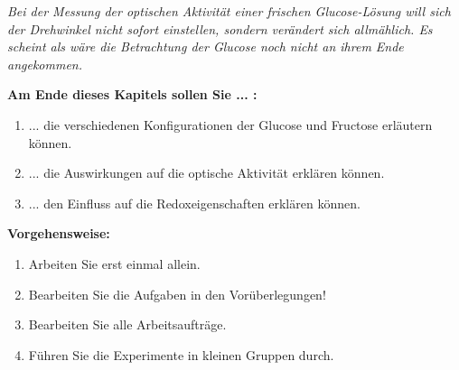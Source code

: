 \documentclass{scrartcl}  %
\begin{document}
		\textit{Bei der Messung der optischen Aktivität einer frischen Glucose-Lösung will sich der Drehwinkel nicht sofort einstellen, sondern verändert sich allmählich. Es scheint als wäre die Betrachtung der Glucose noch nicht an ihrem Ende angekommen.} \newline

		\begin{minipage}{0.7\textwidth}
			\noindent \textbf{Am Ende dieses Kapitels sollen Sie ... :}
			\begin{enumerate}
				\item ... die verschiedenen Konfigurationen der Glucose und Fructose erläutern können.
				\item ... die Auswirkungen auf die optische Aktivität erklären können.
				\item ... den Einfluss auf die Redoxeigenschaften erklären können.
			\end{enumerate}
			\textbf{Vorgehensweise:}
			\begin{enumerate}
				\item Arbeiten Sie erst einmal allein.
				\item Bearbeiten Sie die Aufgaben in den Vorüberlegungen!
				\item Bearbeiten Sie alle Arbeitsaufträge.
				\item Führen Sie die Experimente in kleinen Gruppen durch.
			\end{enumerate}
			
		\end{minipage}
		\hspace{0.1\textwidth}
\end{document}
